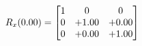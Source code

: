 \documentclass[preview]{standalone}
\begin{document}
\begin{align*}
\special{dvisvgm:raw <g id='unique000'>}R_{x}(0.00) = \begin{bmatrix}1 & 0 & 0 \\0 & +1.00 & +0.00 \\0 & +0.00 & +1.00\end{bmatrix}\special{dvisvgm:raw </g>}
\end{align*}
\end{document}

